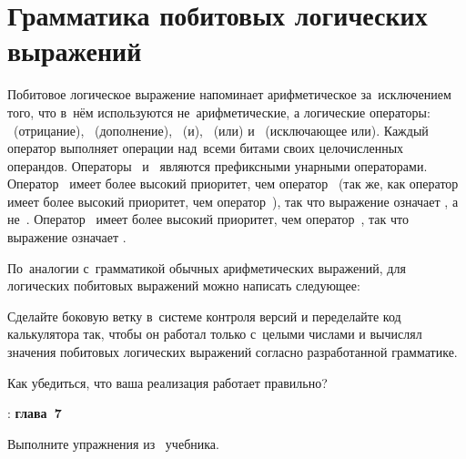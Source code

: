 \section{Грамматика побитовых логических выражений}
Побитовое логическое выражение напоминает арифметическое за~исключением того, что в~нём используются не~арифметические, а логические операторы: \cppinline{!}~(отрицание), \cppinline{~}~(дополнение), \cppinline{&}~(и), \cppinline{|}~(или) и \cppinline{^}~(исключающее или). Каждый оператор выполняет операции над~всеми битами своих целочисленных операндов. Операторы~\cppinline{!} и~\cppinline{~} являются префиксными унарными операторами. Оператор~\cppinline{^} имеет более высокий приоритет, чем оператор~\cppinline{|} (так же, как оператор~\cppinline{*} имеет более высокий приоритет, чем оператор~\cppinline{+}), так что выражение  означает , а не~. Оператор~\cppinline{&} имеет более высокий приоритет, чем оператор~\cppinline{^}, так что выражение  означает .

По~аналогии с~грамматикой обычных арифметических выражений, для логических побитовых выражений можно написать следующее:

Сделайте боковую ветку  в~системе контроля версий и переделайте код калькулятора так, чтобы он работал только с~целыми числами и вычислял значения побитовых логических выражений согласно разработанной грамматике.

Как убедиться, что ваша реализация работает правильно?



\WhatToReadSection
\textcite{Stroustrup:2016:ru}: \textbf{глава~7}



\ExercisesSection
\begin{exercise}
\item Выполните упражнения из~ учебника.
\end{exercise}
